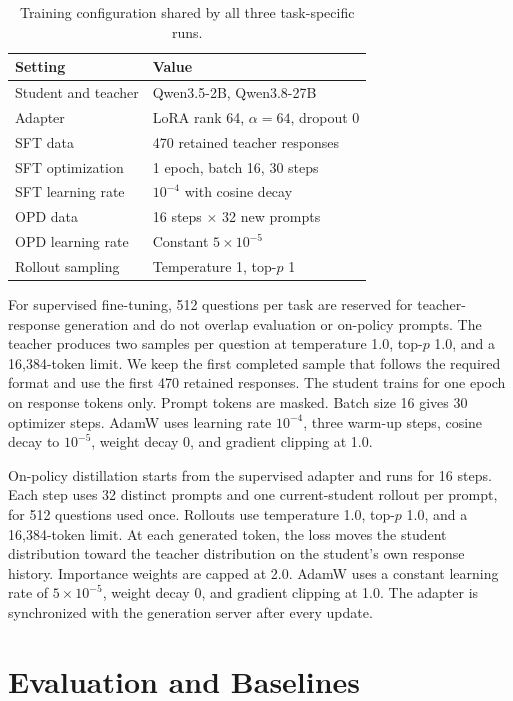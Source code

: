 \documentclass[11pt]{article}
\begin{document}
\begin{table}[t]
\centering
\small
\setlength{\tabcolsep}{4pt}
\begin{tabular}{ll}
\toprule
Setting & Value \\
\midrule
Student and teacher & Qwen3.5-2B, Qwen3.8-27B \\
Adapter & LoRA rank 64, $\alpha=64$, dropout 0 \\
SFT data & 470 retained teacher responses \\
SFT optimization & 1 epoch, batch 16, 30 steps \\
SFT learning rate & $10^{-4}$ with cosine decay \\
OPD data & 16 steps $\times$ 32 new prompts \\
OPD learning rate & Constant $5\times10^{-5}$ \\
Rollout sampling & Temperature 1, top-$p$ 1 \\
\bottomrule
\end{tabular}
\caption{Training configuration shared by all three task-specific runs.}
\label{tab:training-settings}
\end{table}

For supervised fine-tuning, 512 questions per task are reserved for teacher-response generation and do not overlap evaluation or on-policy prompts. The teacher produces two samples per question at temperature 1.0, top-$p$ 1.0, and a 16,384-token limit. We keep the first completed sample that follows the required format and use the first 470 retained responses. The student trains for one epoch on response tokens only. Prompt tokens are masked. Batch size 16 gives 30 optimizer steps. AdamW uses learning rate $10^{-4}$, three warm-up steps, cosine decay to $10^{-5}$, weight decay 0, and gradient clipping at 1.0.

On-policy distillation starts from the supervised adapter and runs for 16 steps. Each step uses 32 distinct prompts and one current-student rollout per prompt, for 512 questions used once. Rollouts use temperature 1.0, top-$p$ 1.0, and a 16,384-token limit. At each generated token, the loss moves the student distribution toward the teacher distribution on the student's own response history. Importance weights are capped at 2.0. AdamW uses a constant learning rate of $5\times10^{-5}$, weight decay 0, and gradient clipping at 1.0. The adapter is synchronized with the generation server after every update.

\section{Evaluation and Baselines}
\end{document}
